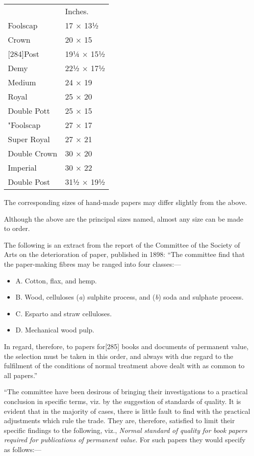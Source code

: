 \documentclass[
]{article}
\providecommand{\tightlist}{%
  \setlength{\itemsep}{0pt}\setlength{\parskip}{0pt}}
\begin{document}
\begin{longtable}[]{@{}ll@{}}
\toprule()
\endhead
~ & Inches. \\
Foolscap & 17 × 13½ \\
Crown & 20 × 15 \\
{\protect\hypertarget{Page_284}{}{{[}284{]}}}Post & 19¼ × 15½ \\
Demy & 22½ × 17½ \\
Medium & 24 × 19 \\
Royal & 25 × 20 \\
Double Pott & 25 × 15 \\
{"}{Foolscap} & 27 × 17 \\
Super Royal & 27 × 21 \\
Double Crown & 30 × 20 \\
Imperial & 30 × 22 \\
Double Post & 31½ × 19½ \\
\bottomrule()
\end{longtable}

The corresponding sizes of hand-made papers may differ slightly from the
above.

Although the above are the principal sizes named, almost any size can be
made to order.

The following is an extract from the report of the Committee of the
Society of Arts on the deterioration of paper, published in 1898: ``The
committee find that the paper-making fibres may be ranged into four
classes:---

\begin{itemize}
\tightlist
\item
  A. Cotton, flax, and hemp.
\item
  B. Wood, celluloses (\emph{a}) sulphite process, and (\emph{b}) soda
  and sulphate process.
\item
  C. Esparto and straw celluloses.
\item
  D. Mechanical wood pulp.
\end{itemize}

In regard, therefore, to papers
for{\protect\hypertarget{Page_285}{}{{[}285{]}}} books and documents of
permanent value, the selection must be taken in this order, and always
with due regard to the fulfilment of the conditions of normal treatment
above dealt with as common to all papers.''

``The committee have been desirous of bringing their investigations to a
practical conclusion in specific terms, viz. by the suggestion of
standards of quality. It is evident that in the majority of cases, there
is little fault to find with the practical adjustments which rule the
trade. They are, therefore, satisfied to limit their specific findings
to the following, viz., \emph{Normal standard of quality for book papers
required for publications of permanent value.} For such papers they
would specify as follows:---
\end{document}
